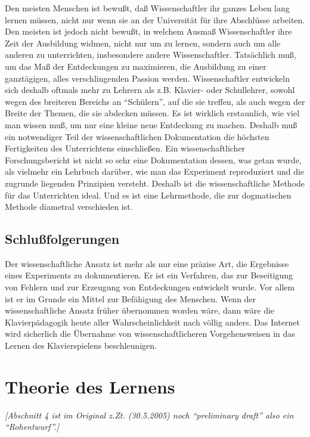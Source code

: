 Den meisten Menschen ist bewußt, daß Wissenschaftler ihr ganzes Leben lang lernen müssen, nicht nur wenn sie an der Universität für ihre Abschlüsse arbeiten.
 Den meisten ist jedoch nicht bewußt, in welchem Ausmaß Wissenschaftler ihre Zeit der Ausbildung widmen, nicht nur um zu lernen, sondern auch um alle anderen zu unterrichten, insbesondere andere Wissenschaftler.
 Tatsächlich muß, um das Maß der Entdeckungen zu maximieren, die Ausbildung zu einer ganztägigen, alles verschlingenden Passion werden.
 Wissenschaftler entwickeln sich deshalb oftmals mehr zu Lehrern als z.B. Klavier- oder Schullehrer, sowohl wegen des breiteren Bereichs an \enquote{Schülern}, auf die sie treffen, als auch wegen der Breite der Themen, die sie abdecken müssen.
 Es ist wirklich erstaunlich, wie viel man wissen muß, um nur eine kleine neue Entdeckung zu machen.
 Deshalb muß ein notwendiger Teil der wissenschaftlichen Dokumentation die höchsten Fertigkeiten des Unterrichtens einschließen.
 Ein wissenschaftlicher Forschungsbericht ist nicht so sehr eine Dokumentation dessen, was getan wurde, als vielmehr ein Lehrbuch darüber, wie man das Experiment reproduziert und die zugrunde liegenden Prinzipien versteht.
 Deshalb ist die wissenschaftliche Methode für das Unterrichten ideal.
 Und es ist eine Lehrmethode, die zur dogmatischen Methode diametral verschieden ist.
 \hypertarget{c3_3h}{}

\subsection{Schlußfolgerungen}

Der wissenschaftliche Ansatz ist mehr als nur eine präzise Art, die Ergebnisse eines Experiments zu dokumentieren.
 Er ist ein Verfahren, das zur Beseitigung von Fehlern und zur Erzeugung von Entdeckungen entwickelt wurde.
 Vor allem ist er im Grunde ein Mittel zur Befähigung des Menschen.
 Wenn der wissenschaftliche Ansatz früher übernommen worden wäre, dann wäre die Klavierpädagogik heute aller Wahrscheinlichkeit nach völlig anders.
 Das Internet wird sicherlich die Übernahme von wissenschaftlicheren Vorgehensweisen in das Lernen des Klavierspielens beschleunigen.
 \hypertarget{c3_4}{}

\section{Theorie des Lernens}

\textit{[Abschnitt 4 ist im Original z.Zt. (30.5.2005) noch \enquote{preliminary draft} also ein \enquote{Rohentwurf}.]}

